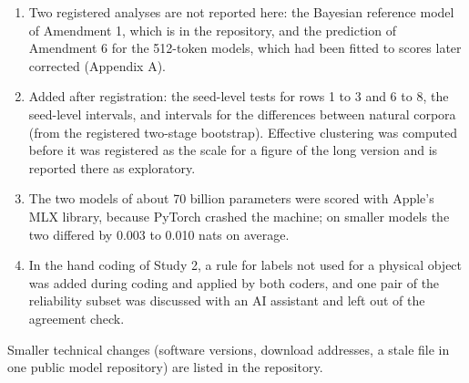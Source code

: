 \FloatBarrier
{}\label{app:B}
\setcounter{table}{0}\renewcommand{\thetable}{B\arabic{table}}
\setcounter{figure}{0}\renewcommand{\thefigure}{B\arabic{figure}}
\begin{enumerate}
\item Two registered analyses are not reported here: the Bayesian reference model of Amendment 1, which is in the repository, and the prediction of Amendment 6 for the 512-token models, which had been fitted to scores later corrected (Appendix A).
\item Added after registration: the seed-level tests for rows 1 to 3 and 6 to 8, the seed-level intervals, and intervals for the differences between natural corpora (from the registered two-stage bootstrap). Effective clustering was computed before it was registered as the scale for a figure of the long version and is reported there as exploratory.
\item The two models of about 70 billion parameters were scored with Apple's MLX library, because PyTorch crashed the machine; on smaller models the two differed by 0.003 to 0.010 nats on average.
\item In the hand coding of Study 2, a rule for labels not used for a physical object was added during coding and applied by both coders, and one pair of the reliability subset was discussed with an AI assistant and left out of the agreement check.
\end{enumerate}

Smaller technical changes (software versions, download addresses, a stale file in one public model repository) are listed in the repository.

